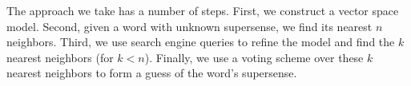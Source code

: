 \documentclass{article}
\begin{document}

The approach we take has a number of steps.
First, we construct a vector space model.
Second, given a word with unknown supersense, we find its nearest $n$ neighbors.
Third, we use search engine queries to refine the model and find the $k$ nearest neighbors (for $k< n$).
Finally, we use a voting scheme over these $k$ nearest neighbors to form a guess of the word's supersense.
\end{document}
